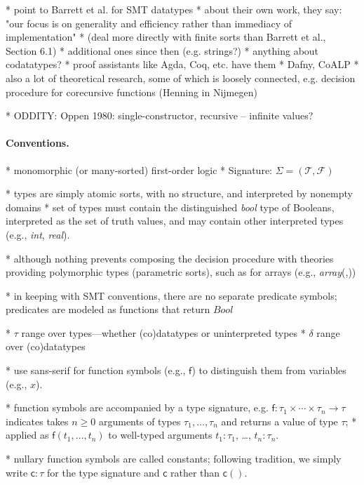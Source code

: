 \documentclass[a4paper,oribibl,envcountsame,draft]{llncs}
\newcommand\const[1]{\textsf{#1}}
\newcommand\ty[1]{\textit{#1}}
\begin{document}
    * point to Barrett et al. for SMT datatypes
      * about their own work, they say: "our focus is on generality and
        efficiency rather than immediacy of implementation"
      * (deal more directly with finite sorts than Barrett et al., Section 6.1)
    * additional ones since then (e.g. strings?)
    * anything about codatatypes?
      * proof assistants like Agda, Coq, etc. have them
      * Dafny, CoALP
      * also a lot of theoretical research, some of which is loosely connected,
        e.g. decision procedure for corecursive functions (Henning in Nijmegen)

    * ODDITY: Oppen 1980: single-constructor, recursive -- infinite values?

\paragraph{Conventions.}

* monomorphic (or many-sorted) first-order logic
* Signature: $\Sigma = (\mathcal{T}, \mathcal{F})$

* types are simply atomic sorts, with no structure, and interpreted by nonempty
  domains
  * set of types must contain the distinguished \ty{bool} type of Booleans, interpreted
    as the set of truth values, and may contain other interpreted types (e.g., \ty{int}, \ty{real}).

* although nothing prevents composing the decision procedure with theories
  providing polymorphic types (parametric sorts), such as for arrays (e.g., \ty{array}(\alpha,\beta))

* in keeping with SMT conventions, there are no separate predicate symbols;
  predicates are modeled as functions that return $\ty{Bool}$

* $\tau$ range over types---whether (co)datatypes or uninterpreted types
* $\delta$ range over (co)datatypes

* use sans-serif for function symbols (e.g., $\const{f}$) to distinguish them
from variables (e.g., $x$).

* function symbols are accompanied by a type signature, e.g. $\const{f} : \tau_1 \times \cdots \times \tau_n \to
\tau$ indicates takes $n \ge 0$ arguments of types $\tau_1,\ldots,\tau_n$ and returns a value of type $\tau$;
* applied as $\const{f}(t_1,\ldots,t_n)$ to well-typed arguments $t_1 : \tau_1$, \ldots,
$t_n : \tau_n$.

* nullary function symbols are called constants;
  following tradition, we simply write $\const{c} : \tau$ for the type signature 
  and $\const{c}$ rather than $\const{c}()$.
\end{document}

